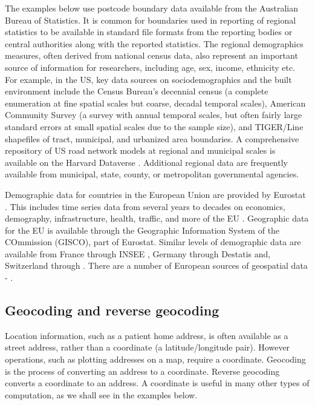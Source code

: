 \documentclass[utf8]{frontiersHLTH}
\begin{document}
The examples below use postcode boundary data available from the
Australian Bureau of Statistics. It is common for boundaries used in
reporting of regional statistics to be available in standard file
formats from the reporting bodies or central authorities along with
the reported statistics. The regional demographics measures, often
derived from national census data, also represent an important source
of information for researchers, including age, sex, income, ethnicity
etc.  For example, in the US, key data sources on sociodemographics
and the built environment include the Census Bureau's decennial census
\cite{us_census_bureau_decennial} (a complete enumeration at fine
spatial scales but coarse, decadal temporal scales), American
Community Survey\cite{us_census_bureau_acs} (a survey
with annual temporal scales, but often fairly large standard errors at
small spatial scales due to the sample size), and TIGER/Line
shapefiles\cite{us_census_tiger_line} of tract,
municipal, and urbanized area boundaries. A comprehensive repository 
of US road network models at regional and municipal scales is available
on the Harvard Dataverse \cite{boeing_street_2019}. Additional regional 
data are frequently available from municipal, state, county, or 
metropolitan governmental agencies.

Demographic data for countries in the European Union are provided by
Eurostat \cite{eurostat}. This includes time series data from several
years to decades on economics, demography, infrastructure, health,
traffic, and more of the EU \cite{Lahti2017}. Geographic data for the
EU is available through the Geographic Information System of the
COmmission (GISCO), part of Eurostat. Similar levels of demographic
data are available from France through INSEE \cite{insee}, Germany
through Destatis \cite{destatis} and, Switzerland through
\cite{swiss-bfs}. There are a number of European sources of geospatial
data - \cite{diva-gis,germany-gis,swiss-3d}.

\subsection{Geocoding and reverse
geocoding}\label{geocoding-and-reverse-geocoding}

Location information, such as a patient home address, is often available
as a street address, rather than a coordinate (a latitude/longitude
pair). However operations, such as plotting addresses on a map, require
a coordinate. Geocoding is the process of converting an address to a
coordinate. Reverse geocoding converts a coordinate to an address. A
coordinate is useful in many other types of computation, as we shall see
in the examples below.
\end{document}
